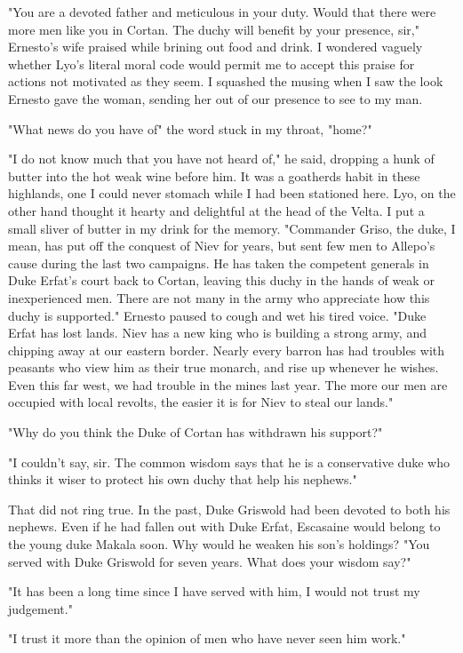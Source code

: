\documentclass{article}
\begin{document}
"You are a devoted father and meticulous in your duty. Would that there were more men like you in Cortan. The duchy will benefit by your presence, sir," Ernesto's wife praised while brining out food and drink. I wondered vaguely whether Lyo's literal moral code would permit me to accept this praise for actions not motivated as they seem. I squashed the musing when I saw the look Ernesto gave the woman, sending her out of our presence to see to my man. 

"What news do you have of" the word stuck in my throat, "home?"

"I do not know much that you have not heard of," he said, dropping a hunk of butter into the hot weak wine before him. It was a goatherds habit in these highlands, one I could never stomach while I had been stationed here. Lyo, on the other hand thought it hearty and delightful at the head of the Velta. I put a small sliver of butter in my drink for the memory. "Commander Griso, the duke, I mean, has put off the conquest of Niev for years, but sent few men to Allepo's cause during the last two campaigns. He has taken the competent generals in Duke Erfat's court back to Cortan, leaving this duchy in the hands of weak or inexperienced men. There are not many in the army who appreciate how this duchy is supported." Ernesto paused to cough and wet his tired voice. "Duke Erfat has lost lands. Niev has a new king who is building a strong army, and chipping away at our eastern border. Nearly every barron has had troubles with peasants who view him as their true monarch, and rise up whenever he wishes. Even this far west, we had trouble in the mines last year. The more our men are occupied with local revolts, the easier it is for Niev to steal our lands."

"Why do you think the Duke of Cortan has withdrawn his support?"

"I couldn't say, sir. The common wisdom says that he is a conservative duke who thinks it wiser to protect his own duchy that help his nephews."

That did not ring true. In the past, Duke Griswold had been devoted to both his nephews. Even if he had fallen out with Duke Erfat, Escasaine would belong to the young duke Makala soon. Why would he weaken his son's holdings? "You served with Duke Griswold for seven years. What does your wisdom say?"

"It has been a long time since I have served with him, I would not trust my judgement."

"I trust it more than the opinion of men who have never seen him work."
\end{document}

